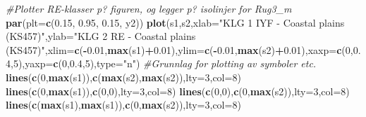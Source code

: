 \documentclass[]{article}
\newenvironment{Shaded}{\begin{snugshade}}{\end{snugshade}}
\newcommand{\CommentTok}[1]{\textcolor[rgb]{0.56,0.35,0.01}{\textit{#1}}}
\newcommand{\DataTypeTok}[1]{\textcolor[rgb]{0.13,0.29,0.53}{#1}}
\newcommand{\DecValTok}[1]{\textcolor[rgb]{0.00,0.00,0.81}{#1}}
\newcommand{\FloatTok}[1]{\textcolor[rgb]{0.00,0.00,0.81}{#1}}
\newcommand{\KeywordTok}[1]{\textcolor[rgb]{0.13,0.29,0.53}{\textbf{#1}}}
\newcommand{\NormalTok}[1]{#1}
\newcommand{\OperatorTok}[1]{\textcolor[rgb]{0.81,0.36,0.00}{\textbf{#1}}}
\newcommand{\StringTok}[1]{\textcolor[rgb]{0.31,0.60,0.02}{#1}}
\begin{document}
\begin{Shaded}
\begin{Highlighting}[]
\CommentTok{#Plotter RE-klasser p? figuren, og legger p? isolinjer for Rug3_m}
\KeywordTok{par}\NormalTok{(}\DataTypeTok{plt=}\KeywordTok{c}\NormalTok{(}\FloatTok{0.15}\NormalTok{, }\FloatTok{0.95}\NormalTok{, }\FloatTok{0.15}\NormalTok{, y2))}
\KeywordTok{plot}\NormalTok{(s1,s2,}\DataTypeTok{xlab=}\StringTok{"KLG 1 IYF - Coastal plains (KS457)"}\NormalTok{,}\DataTypeTok{ylab=}\StringTok{"KLG 2 RE - Coastal plains (KS457)"}\NormalTok{,}\DataTypeTok{xlim=}\KeywordTok{c}\NormalTok{(}\OperatorTok{-}\FloatTok{0.01}\NormalTok{,}\KeywordTok{max}\NormalTok{(s1)}\OperatorTok{+}\FloatTok{0.01}\NormalTok{),}\DataTypeTok{ylim=}\KeywordTok{c}\NormalTok{(}\OperatorTok{-}\FloatTok{0.01}\NormalTok{,}\KeywordTok{max}\NormalTok{(s2)}\OperatorTok{+}\FloatTok{0.01}\NormalTok{),}\DataTypeTok{xaxp=}\KeywordTok{c}\NormalTok{(}\DecValTok{0}\NormalTok{,}\FloatTok{0.4}\NormalTok{,}\DecValTok{5}\NormalTok{),}\DataTypeTok{yaxp=}\KeywordTok{c}\NormalTok{(}\DecValTok{0}\NormalTok{,}\FloatTok{0.4}\NormalTok{,}\DecValTok{5}\NormalTok{),}\DataTypeTok{type=}\StringTok{"n"}\NormalTok{) }\CommentTok{#Grunnlag for plotting av symboler etc.}
\KeywordTok{lines}\NormalTok{(}\KeywordTok{c}\NormalTok{(}\DecValTok{0}\NormalTok{,}\KeywordTok{max}\NormalTok{(s1)),}\KeywordTok{c}\NormalTok{(}\KeywordTok{max}\NormalTok{(s2),}\KeywordTok{max}\NormalTok{(s2)),}\DataTypeTok{lty=}\DecValTok{3}\NormalTok{,}\DataTypeTok{col=}\DecValTok{8}\NormalTok{)}
\KeywordTok{lines}\NormalTok{(}\KeywordTok{c}\NormalTok{(}\DecValTok{0}\NormalTok{,}\KeywordTok{max}\NormalTok{(s1)),}\KeywordTok{c}\NormalTok{(}\DecValTok{0}\NormalTok{,}\DecValTok{0}\NormalTok{),}\DataTypeTok{lty=}\DecValTok{3}\NormalTok{,}\DataTypeTok{col=}\DecValTok{8}\NormalTok{)}
\KeywordTok{lines}\NormalTok{(}\KeywordTok{c}\NormalTok{(}\DecValTok{0}\NormalTok{,}\DecValTok{0}\NormalTok{),}\KeywordTok{c}\NormalTok{(}\DecValTok{0}\NormalTok{,}\KeywordTok{max}\NormalTok{(s2)),}\DataTypeTok{lty=}\DecValTok{3}\NormalTok{,}\DataTypeTok{col=}\DecValTok{8}\NormalTok{)}
\KeywordTok{lines}\NormalTok{(}\KeywordTok{c}\NormalTok{(}\KeywordTok{max}\NormalTok{(s1),}\KeywordTok{max}\NormalTok{(s1)),}\KeywordTok{c}\NormalTok{(}\DecValTok{0}\NormalTok{,}\KeywordTok{max}\NormalTok{(s2)),}\DataTypeTok{lty=}\DecValTok{3}\NormalTok{,}\DataTypeTok{col=}\DecValTok{8}\NormalTok{)}


\end{Highlighting}
\end{Shaded}
\end{document}
